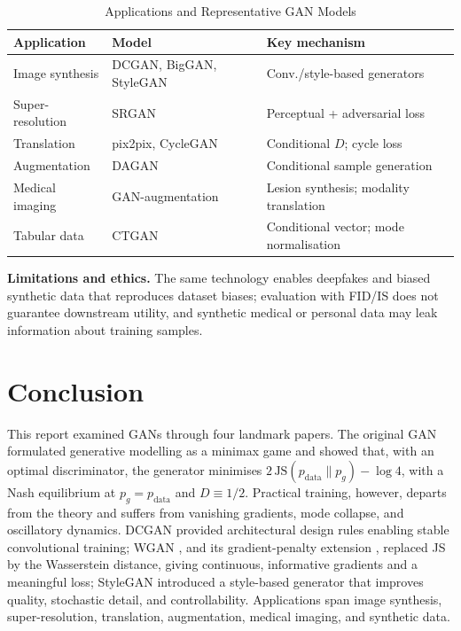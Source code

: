 \documentclass[conference]{IEEEtran}
\newcommand{\pdata}{p_{\mathrm{data}}}
\newcommand{\pg}{p_{g}}
\newcommand{\JS}{\mathrm{JS}}
\theoremstyle{plain}
\theoremstyle{definition}
\begin{document}
\begin{table}[t]
\centering
\caption{Applications and Representative GAN Models}
\label{tab:apps}
\footnotesize
\renewcommand{\arraystretch}{1.1}
\begin{tabular}{@{}p{1.8cm}p{2.0cm}p{3.3cm}@{}}
\toprule
\textbf{Application} & \textbf{Model} & \textbf{Key mechanism} \\
\midrule
Image synthesis & DCGAN, BigGAN, StyleGAN & Conv./style-based generators \\
Super-resolution & SRGAN \cite{ledig2017srgan} & Perceptual + adversarial loss \\
Translation & pix2pix, CycleGAN & Conditional $D$; cycle loss \\
Augmentation & DAGAN \cite{antoniou2017dagan} & Conditional sample generation \\
Medical imaging & GAN-augmentation \cite{fridadar2018liver} & Lesion synthesis; modality translation \\
Tabular data & CTGAN \cite{xu2019ctgan} & Conditional vector; mode normalisation \\
\bottomrule
\end{tabular}
\end{table}

\textbf{Limitations and ethics.} The same technology enables deepfakes and biased synthetic data that reproduces dataset biases; evaluation with FID/IS does not guarantee downstream utility, and synthetic medical or personal data may leak information about training samples.

\section{Conclusion}\label{sec:concl}
This report examined GANs through four landmark papers. The original GAN \cite{goodfellow2014gan} formulated generative modelling as a minimax game and showed that, with an optimal discriminator, the generator minimises $2\,\JS(\pdata\|\pg)-\log4$, with a Nash equilibrium at $\pg=\pdata$ and $D\equiv1/2$. Practical training, however, departs from the theory and suffers from vanishing gradients, mode collapse, and oscillatory dynamics. DCGAN \cite{radford2016dcgan} provided architectural design rules enabling stable convolutional training; WGAN \cite{arjovsky2017wgan}, and its gradient-penalty extension \cite{gulrajani2017wgangp}, replaced JS by the Wasserstein distance, giving continuous, informative gradients and a meaningful loss; StyleGAN \cite{karras2019stylegan} introduced a style-based generator that improves quality, stochastic detail, and controllability. Applications span image synthesis, super-resolution, translation, augmentation, medical imaging, and synthetic data.
\end{document}
